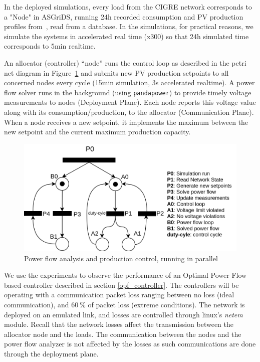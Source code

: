 \documentclass[conference]{IEEEtran}
\begin{document}
In the deployed simulations, every load from the CIGRE network corresponds to a "Node" in ASGriDS, running 24h recorded consumption and PV production profiles from~\cite{espinosa2015dissemination}, read from a database. In the simulations, for practical reasons, we simulate the systems in accelerated real time (x300) so that 24h simulated time corresponds to 5min realtime. 

An allocator (controller) ``node'' runs the control loop as described in the petri net\cite{petersonPetriNets1977} diagram in Figure~\ref{pp_pi} and submits new PV production setpoints to all concerned nodes every cycle (15min simulation, 3s accelerated realtime). A power flow solver runs in the background (using \texttt{pandapower}) to provide timely voltage measurements to nodes (Deployment Plane). Each node reports this voltage value along with its consumption/production, to the allocator (Communication Plane). When a node receives a new setpoint, it implements the maximum between the new setpoint and the current maximum production capacity.


\begin{figure}[htp]
	\centering
	\includegraphics[width=\linewidth]{figs/pandapower.png}
	\caption{Power flow analysis and production control, running in parallel}
	\label{pp_pi}
\end{figure}

We use the experiments to observe the performance of an Optimal Power Flow based controller described in section \ref{opf_controller}. The controllers will be operating with a communication packet loss ranging between no loss (ideal communication), and $60~\%$ of packet loss (extreme conditions). The network is deployed on an emulated link, and losses are controlled through linux's \emph{netem} module. Recall that the network losses affect the transmission between the allocator node and the loads. The communication between the nodes and the power flow analyzer is not affected by the losses as such communications are done through the deployment plane.
\end{document}
